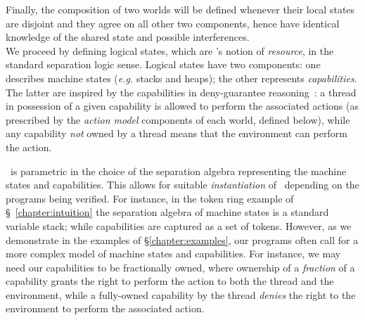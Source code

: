 
Finally, the composition of two worlds will be defined whenever their local states are disjoint and they agree on all other two components, hence have identical knowledge of the shared state and possible interferences.\\

We proceed by defining logical states, which are \colosl's notion of \emph{resource}, in the standard separation logic sense. Logical states have two components: one describes machine states (\textit{e.g.} stacks and heaps); the other
represents \emph{capabilities}. The latter are inspired by the capabilities in deny-guarantee reasoning~\cite{dg}: a thread in possession of a given capability is allowed to perform the associated actions (as prescribed by the \emph{action model} components of each world, defined below), while any capability \emph{not} owned by a thread means that the environment can perform the action.

\colosl\ is parametric in the choice of the separation algebra representing the machine states and capabilities. This allows for suitable \emph{instantiation} of \colosl\ depending on the programs being verified. For instance, in the token ring example of \S~\ref{chapter:intuition} the separation algebra of machine states is a standard variable stack; while capabilities are captured as a set of tokens. However, as we demonstrate in the examples of \S\ref{chapter:examples}, our programs often call for a more complex model of machine states and capabilities. For instance, we may need our capabilities to be fractionally owned, where ownership of a \emph{fraction} of a capability grants the right to perform the action to both the thread and the environment, while a fully-owned capability by the thread \emph{denies} the right to the environment to perform the associated action. 

